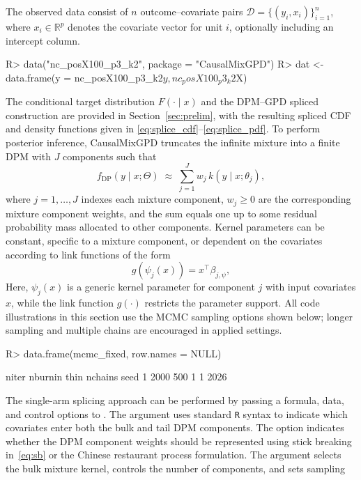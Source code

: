 \documentclass[11pt]{article}\usepackage[]{graphicx}\usepackage[]{xcolor}
\newcommand{\pkg}[1]{\textsf{#1}}
\newcommand{\proglang}[1]{\texttt{#1}}
\newcommand{\code}[1]{\texttt{\detokenize{#1}}}
\renewenvironment{Schunk}{\vspace{0pt}}{\vspace{-0.1\baselineskip}}
\begin{document}
The observed data consist of $n$ outcome--covariate pairs
$\mathcal{D}=\{(y_i,x_i)\}_{i=1}^n$, where $x_i\in\mathbb{R}^p$
denotes the covariate vector for unit $i$, optionally including an
intercept column.

\begin{Schunk}
\begin{Sinput}
R> data("nc_posX100_p3_k2", package = "CausalMixGPD")
R> dat <- data.frame(y = nc_posX100_p3_k2$y, nc_posX100_p3_k2$X)
\end{Sinput}
\end{Schunk}

The conditional target distribution $F(\cdot\mid x)$ and the DPM--GPD
spliced construction are provided in Section~\ref{sec:prelim},
with the resulting spliced CDF and density functions given in
\eqref{eq:splice_cdf}--\eqref{eq:splice_pdf}. To perform posterior
inference, \pkg{CausalMixGPD} truncates the infinite mixture into
a finite DPM with $J$ components such that
\begin{equation*}
f_{\mathrm{DP}}(y\mid x;\Theta)\;\approx\;\sum_{j=1}^{J} w_j\,k(y\mid x;\theta_j),
\end{equation*}
where $j=1,\ldots,J$ indexes each mixture component, $w_j\ge 0$
are the corresponding mixture component weights, and the sum equals
one up to some residual probability mass allocated to other
components. Kernel parameters can be constant, specific to a
mixture component, or dependent on the covariates according to
link functions of the form
\begin{equation*}
  g\!\left(\psi_j(x)\right)=x^\top \beta_{j,\psi},
\end{equation*}
Here, $\psi_j(x)$ is a generic kernel parameter for component $j$
with input covariates $x$, while the link function $g(\cdot)$
restricts the parameter support. All code illustrations in this
section use the MCMC sampling options shown below;
longer sampling and multiple chains are encouraged in applied settings.

\begin{Schunk}
\begin{Sinput}
R> data.frame(mcmc_fixed, row.names = NULL)
\end{Sinput}
\begin{Soutput}
  niter nburnin thin nchains seed
1  2000     500    1       1 2026
\end{Soutput}
\end{Schunk}

The single-arm splicing approach can be performed by passing a
formula, data, and control options to \code{dpmgpd()}. The
\code{formula} argument uses standard \proglang{R} syntax to indicate
which covariates enter both the bulk and tail DPM components.
The \code{backend} option indicates whether the DPM component
weights should be represented using stick breaking in~\eqref{eq:sb}
or the Chinese restaurant process formulation. The \code{kernel}
argument selects the bulk mixture kernel, \code{components}
controls the number of components, and \code{mcmc} sets sampling
\end{document}
